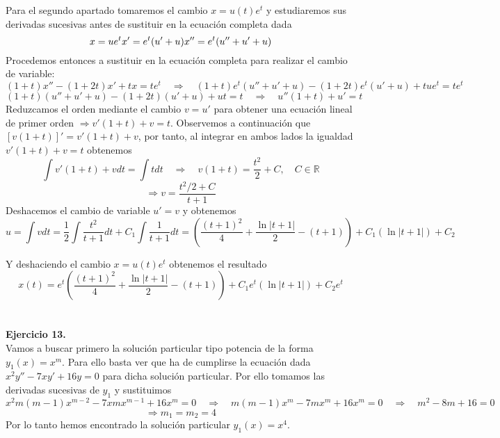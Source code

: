 \documentclass[fleqn]{article}
\def\R{\mathds{R}}
\begin{document}
    Para el segundo apartado tomaremos el cambio $x=u(t)e^t$ y estudiaremos sus derivadas sucesivas antes de sustituir en la ecuación completa dada
    \begin{equation*}
        x=ue^t\\
        x'=e^t(u' + u) \\
        x''=e^t(u'' + u' + u)\\
    \end{equation*}
    Procedemos entonces a sustituir en la ecuación completa para realizar el cambio de variable:
    $$(1+t)x'' - (1+2t)x' + tx = te^t \quad \Rightarrow \quad (1+t)e^t(u'' + u' + u) - (1+2t)e^t(u' + u) + tue^t = te^t$$
    $$(1+t)(u'' + u' + u) - (1+2t)(u' + u) + ut = t \quad \Rightarrow \quad u''(1+t)+u' = t$$
    Reduzcamos el orden mediante el cambio $v=u'$ para obtener una ecuación lineal de primer orden $\Rightarrow v'(1+t)+v = t$. Observemos a continuación que $[v(1+t)]' = v'(1+t)+v$, por
    tanto, al integrar en ambos lados la igualdad $v'(1+t)+v = t$ obtenemos
    $$\int v'(1+t)+v dt= \int t dt \quad \Rightarrow \quad v(1+t) = \frac{t^2}{2} + C, \quad C\in \R$$
    $$\Rightarrow v=\frac{t^2/2 + C}{t+1}$$
    Deshacemos el cambio de variable $u'=v$ y obtenemos 
    $$u = \int v dt = \frac{1}{2}\int \frac{t^2}{t+1}dt + C_1\int \frac{1}{t+1}dt = \left(\frac{(t+1)^2}{4} + \frac{\ln|t+1|}{2} - (t+1)\right) + C_1(\ln|t+1|) + C_2$$

    Y deshaciendo el cambio $x=u(t)e^t$ obtenemos el resultado
    $$x(t) =e^t\left(\frac{(t+1)^2}{4} + \frac{\ln|t+1|}{2} - (t+1)\right) + C_1e^t(\ln|t+1|) + C_2e^t$$\\ \\

    \textbf{Ejercicio 13.} \\

    Vamos a buscar primero la solución particular tipo potencia de la forma $y_1(x)=x^m$. Para ello basta ver que ha de cumplirse la ecuación dada 
    $x^2y'' -7xy' + 16y = 0$ para dicha solución particular. Por ello tomamos las derivadas sucesivas de $y_1$ y sustituimos
    $$x^2m(m-1)x^{m-2} -7xmx^{m-1} + 16x^m = 0 \quad \Rightarrow \quad m(m-1)x^m -7mx^{m} + 16x^m = 0 \quad \Rightarrow \quad m^2 - 8m + 16 = 0$$
    $$\Rightarrow m_1=m_2=4$$
    Por lo tanto hemos encontrado la solución particular $y_1(x)=x^4$.
\end{document}
